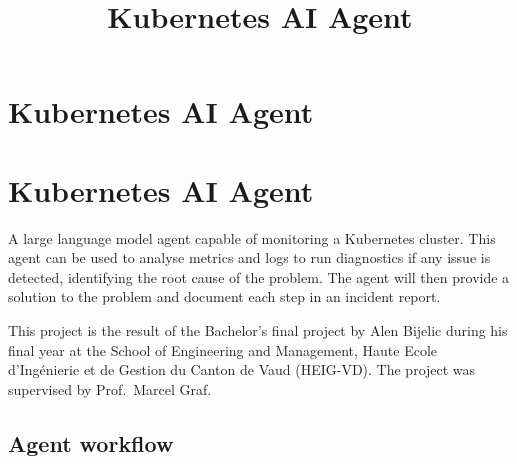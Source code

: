 \documentclass[
]{article}
\title{Kubernetes AI Agent}
\author{}
\date{}
\begin{document}
\maketitle

\hypertarget{title-block-header}{}
\hypertarget{kubernetes-ai-agent}{%
\section{Kubernetes AI Agent}\label{kubernetes-ai-agent}}

\hypertarget{kubernetes-ai-agent}{%
\section{Kubernetes AI Agent}\label{kubernetes-ai-agent}}

A large language model agent capable of monitoring a Kubernetes cluster.
This agent can be used to analyse metrics and logs to run diagnostics if
any issue is detected, identifying the root cause of the problem. The
agent will then provide a solution to the problem and document each step
in an incident report.

This project is the result of the Bachelor's final project by Alen
Bijelic during his final year at the School of Engineering and
Management, Haute Ecole d'Ingénierie et de Gestion du Canton de Vaud
(HEIG-VD). The project was supervised by Prof.~Marcel Graf.

\hypertarget{agent-workflow}{%
\subsection{Agent workflow}\label{agent-workflow}}
\end{document}
